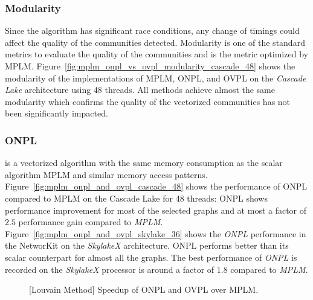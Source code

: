\documentclass[default,iicol]{sn-jnl}%
\theoremstyle{thmstyleone}%
\theoremstyle{thmstyletwo}%
\theoremstyle{thmstylethree}%
\begin{document}
\subsubsection{Modularity}
Since the algorithm has significant race conditions, any change of
timings could affect the quality of the communities detected.
Modularity is one of the standard metrics to evaluate the quality of
the communities and is the metric optimized by MPLM.
Figure~\ref{fig:mplm_onpl_vs_ovpl_modularity_cascade_48} shows the
modularity of the implementations of MPLM, ONPL, and OVPL on the
\textit{Cascade Lake} architecture using 48 threads. All methods
achieve almost the same modularity which confirms the quality of the
vectorized communities has not been significantly impacted.

\subsubsection{ONPL}
is a vectorized algorithm with  the same memory consumption as the
scalar algorithm MPLM and similar memory access
patterns. Figure~\ref{fig:mplm_onpl_and_ovpl_cascade_48} shows the
performance of ONPL compared to MPLM on the Cascade Lake for 48
threads: ONPL shows performance improvement for most
of the selected graphs and at most a factor of $2.5$
performance gain compared to \textit{MPLM}.
Figure~\ref{fig:mplm_onpl_and_ovpl_skylake_36} shows the \textit{ONPL}
performance in the NetworKit on the \textit{SkylakeX} architecture.
ONPL performs better than its scalar counterpart for almost all the
graphs.  The best performance of \textit{ONPL} is recorded on the
\textit{SkylakeX} processor is around a factor of $1.8$ compared to
\textit{MPLM}.

\begin{figure}[t]
      \centering
      \caption{[Louvain Method] Speedup of ONPL and OVPL over MPLM.}   
      \label{fig:speedup_mplm_onpl_ovpl}
 \end{figure}
\end{document}
